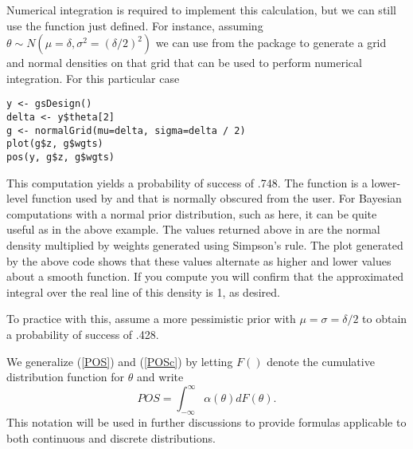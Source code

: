 Numerical integration is required to implement this calculation, but we can still use the  function just defined.
For instance, assuming $\theta\sim N(\mu=\delta, \sigma^2=(\delta/2)^2)$ we can use  from the  package to generate a grid and normal densities on that grid that can be used to perform numerical integration.
For this particular case
\begin{verbatim}
y <- gsDesign()
delta <- y$theta[2]
g <- normalGrid(mu=delta, sigma=delta / 2)
plot(g$z, g$wgts)
pos(y, g$z, g$wgts)
\end{verbatim}
This computation yields a probability of success of .748. 
The  function is a lower-level function used by  and  that is normally obscured from the user.
For Bayesian computations with a normal prior distribution, such as here, it can be quite useful as in the above example.
The values returned above in  are the normal density multiplied by weights generated using Simpson's rule.
The plot generated by the above code shows that these values alternate as higher and lower values about a smooth function. 
If you compute  you will confirm that the approximated integral over the real line of this density is 1, as desired.

To practice with this, assume a more pessimistic prior with $\mu=\sigma=\delta/2$ to obtain a probability of success of .428.   

We generalize (\ref{POS}) and (\ref{POSc}) by letting $F()$ denote the cumulative distribution function for $\theta$ and write
\begin{equation}
POS=\int_{-\infty}^\infty \alpha(\theta)dF(\theta).\label{POSg}
\end{equation}
This notation will be used in further discussions to provide formulas applicable to both continuous and discrete distributions.

